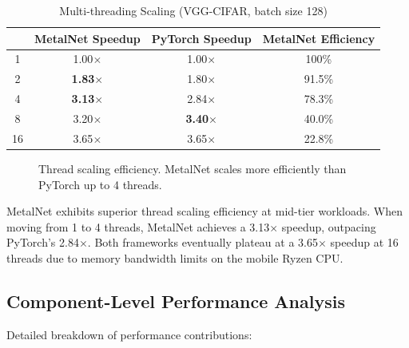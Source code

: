 \documentclass[12pt,oneside,a4paper]{report}
\newcommand{\hdr}{\rowcolor{mnHeaderBg}}
\newcommand{\hcell}[1]{{\bfseries\color{white}#1}}
\newcommand{\win}[1]{{\bfseries\color{mnGreen}#1}}
\newcommand{\zebra}{\rowcolors{2}{mnRowA}{mnRowB}}
\newenvironment{ptable}[2]{%
  \begin{table}[H]\centering
  \caption{#1}%
  \vspace{2pt}%
  \zebra
  \setlength{\arrayrulewidth}{0.5pt}%
  \begin{tabular}{#2}\toprule}%
  {\bottomrule\end{tabular}\end{table}}
\begin{document}
\begin{ptable}{Multi-threading Scaling (VGG-CIFAR, batch size 128)}{c c c c}
\hdr \hcell{Threads} & \hcell{MetalNet Speedup} & \hcell{PyTorch Speedup} & \hcell{MetalNet Efficiency} \\ \midrule
1  & 1.00$\times$ & 1.00$\times$ & 100\% \\
2  & \win{1.83$\times$} & 1.80$\times$ & 91.5\% \\
4  & \win{3.13$\times$} & 2.84$\times$ & 78.3\% \\
8  & 3.20$\times$ & \win{3.40$\times$} & 40.0\% \\
16 & 3.65$\times$ & 3.65$\times$ & 22.8\% \\
\end{ptable}

\begin{figure}[H]
\centering
{}
\caption[OpenMP scaling efficiency]{Thread scaling efficiency. MetalNet scales more efficiently than PyTorch up to 4 threads.}
\label{fig:threadscaling}
\end{figure}

MetalNet exhibits superior thread scaling efficiency at mid-tier workloads. When moving from 1 to 4 threads, MetalNet achieves a 3.13$\times$ speedup, outpacing PyTorch's 2.84$\times$. Both frameworks eventually plateau at a 3.65$\times$ speedup at 16 threads due to memory bandwidth limits on the mobile Ryzen CPU.

\subsection{Component-Level Performance Analysis}

Detailed breakdown of performance contributions:
\end{document}
